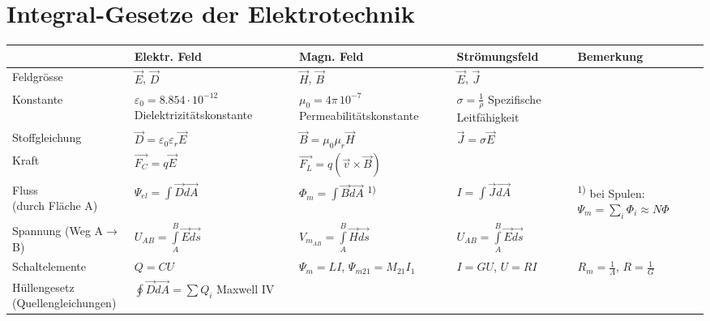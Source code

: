   \section{Integral-Gesetze der Elektrotechnik}
	\renewcommand{\arraystretch}{2}
	\begin{tabular}{|p{2.5cm}||p{2.7cm}|p{4cm}|p{2.7cm}|p{5cm}|}
	\hline
	& \textbf{Elektr. Feld} & \textbf{Magn. Feld} & \textbf{Strömungsfeld} & \textbf{Bemerkung}\\
	\hline \hline
	Feldgrösse & $\vec{E}$, $\vec{D}$ & $\vec{H}$, $\vec{B}$
	& $\vec{E}$, $\vec{J}$ &\\
	\hline
	Konstante
		& \parbox{2.7cm}{$\varepsilon_0 = 8.854 \cdot 10^{-12}$\\
		{\tiny Dielektrizitätskonstante} \vspace{.1cm}} 
		& \parbox{4cm}{$\mu_0 = 4 \pi \, 10^{-7}$\\ {\tiny Permeabilitätskonstante} \vspace{.1cm}} 
		& \parbox{2.7cm}{$\sigma=\frac{1}{\rho}$ \\ {\tiny Spezifische
		Leitfähigkeit}\vspace{.1cm}} &\\ 
	\hline
	Stoffgleichung & $\vec{D}=\varepsilon_0\varepsilon_r\vec{E}$ & $\vec{B}=\mu_0\mu_r\vec{H}$
	& $\vec{J}=\sigma\vec{E}$ &
	\\
	\hline
	Kraft & $\vec{F_C}=q\vec{E}$ & $\vec{F_L}=q(\vec{v}\times\vec{B})$ &&\\
	\hline
	\parbox{2.5cm}{Fluss\\{\tiny (durch Fläche A)}} & $\Psi_{el}=\int\vec{D}\vec{dA}$ &
	$\Phi_m=\int\vec{B}\vec{dA}$ \textsuperscript{1)}&
	$I=\int\vec{J}\vec{dA}$ & \textsuperscript{1)} bei Spulen:
	$\Psi_m=\sum_i\Phi_i\approx N \Phi$\\
	\hline
	\parbox{2.5cm}{Spannung \\{\tiny (Weg A$\to$B)}} & $U_{AB}=\int\limits_{A}^B
	\vec{E}\vec{ds}$ & $V_{m_{AB}}=\int\limits_{A}^B\vec{H}\vec{ds}$ 
	& $U_{AB}=\int\limits_{A}^B\vec{E}\vec{ds}$ & \\
	\hline
	Schaltelemente & $Q=CU$ & $\Psi_m=LI$, $\Psi_{m21}=M_{21}I_1$
	& $I=GU$, $U=RI$ & $R_m=\frac{1}{\Lambda}$, $R=\frac{1}{G}$\\
	\hline
	\parbox{2.5cm}{Hüllengesetz \\ {\tiny (Quellengleichungen)}}
		& \parbox{2.7cm}{
			\vspace{.1cm}$\oint\vec{D}\vec{dA}=\sum Q_i$ \vspace{.1cm}
			Maxwell IV
			\vspace{.1cm}}

\end{tabular}
